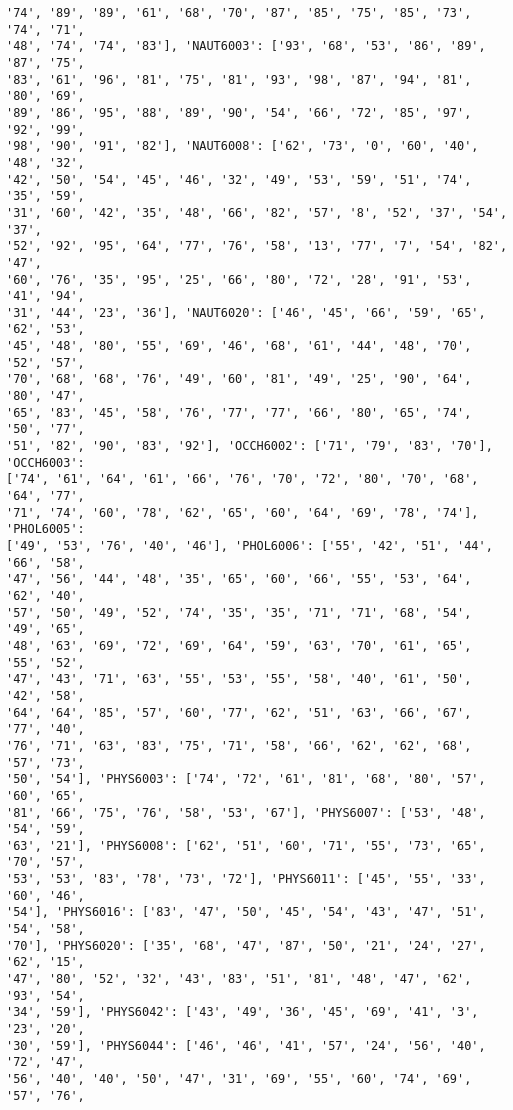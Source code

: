 \documentclass[11pt]{article}
\begin{document}
\begin{Verbatim}[commandchars=\\\{\}]
'74', '89', '89', '61', '68', '70', '87', '85', '75', '85', '73', '74', '71',
'48', '74', '74', '83'], 'NAUT6003': ['93', '68', '53', '86', '89', '87', '75',
'83', '61', '96', '81', '75', '81', '93', '98', '87', '94', '81', '80', '69',
'89', '86', '95', '88', '89', '90', '54', '66', '72', '85', '97', '92', '99',
'98', '90', '91', '82'], 'NAUT6008': ['62', '73', '0', '60', '40', '48', '32',
'42', '50', '54', '45', '46', '32', '49', '53', '59', '51', '74', '35', '59',
'31', '60', '42', '35', '48', '66', '82', '57', '8', '52', '37', '54', '37',
'52', '92', '95', '64', '77', '76', '58', '13', '77', '7', '54', '82', '47',
'60', '76', '35', '95', '25', '66', '80', '72', '28', '91', '53', '41', '94',
'31', '44', '23', '36'], 'NAUT6020': ['46', '45', '66', '59', '65', '62', '53',
'45', '48', '80', '55', '69', '46', '68', '61', '44', '48', '70', '52', '57',
'70', '68', '68', '76', '49', '60', '81', '49', '25', '90', '64', '80', '47',
'65', '83', '45', '58', '76', '77', '77', '66', '80', '65', '74', '50', '77',
'51', '82', '90', '83', '92'], 'OCCH6002': ['71', '79', '83', '70'], 'OCCH6003':
['74', '61', '64', '61', '66', '76', '70', '72', '80', '70', '68', '64', '77',
'71', '74', '60', '78', '62', '65', '60', '64', '69', '78', '74'], 'PHOL6005':
['49', '53', '76', '40', '46'], 'PHOL6006': ['55', '42', '51', '44', '66', '58',
'47', '56', '44', '48', '35', '65', '60', '66', '55', '53', '64', '62', '40',
'57', '50', '49', '52', '74', '35', '35', '71', '71', '68', '54', '49', '65',
'48', '63', '69', '72', '69', '64', '59', '63', '70', '61', '65', '55', '52',
'47', '43', '71', '63', '55', '53', '55', '58', '40', '61', '50', '42', '58',
'64', '64', '85', '57', '60', '77', '62', '51', '63', '66', '67', '77', '40',
'76', '71', '63', '83', '75', '71', '58', '66', '62', '62', '68', '57', '73',
'50', '54'], 'PHYS6003': ['74', '72', '61', '81', '68', '80', '57', '60', '65',
'81', '66', '75', '76', '58', '53', '67'], 'PHYS6007': ['53', '48', '54', '59',
'63', '21'], 'PHYS6008': ['62', '51', '60', '71', '55', '73', '65', '70', '57',
'53', '53', '83', '78', '73', '72'], 'PHYS6011': ['45', '55', '33', '60', '46',
'54'], 'PHYS6016': ['83', '47', '50', '45', '54', '43', '47', '51', '54', '58',
'70'], 'PHYS6020': ['35', '68', '47', '87', '50', '21', '24', '27', '62', '15',
'47', '80', '52', '32', '43', '83', '51', '81', '48', '47', '62', '93', '54',
'34', '59'], 'PHYS6042': ['43', '49', '36', '45', '69', '41', '3', '23', '20',
'30', '59'], 'PHYS6044': ['46', '46', '41', '57', '24', '56', '40', '72', '47',
'56', '40', '40', '50', '47', '31', '69', '55', '60', '74', '69', '57', '76',

\end{Verbatim}
\end{document}
